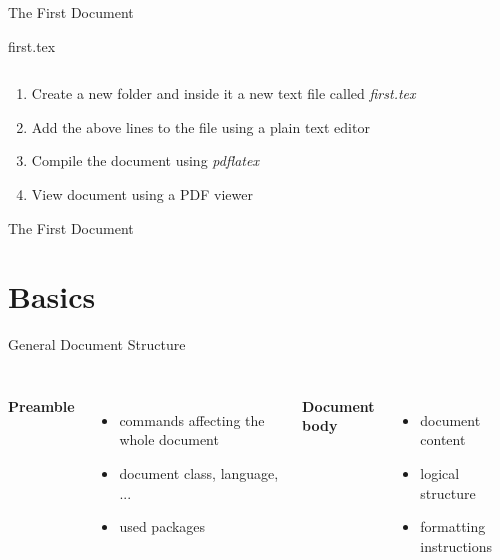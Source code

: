 \documentclass[table]{beamer}
\begin{document}
\begin{frame}[fragile]{The First Document}
    \begin{block}{first.tex}
        \inputminted{latex}{resource/first.tex}
    \end{block}

    \begin{enumerate}
        \item Create a new folder and inside it a new text file called \emph{first.tex}
        \item Add the above lines to the file using a plain text editor
        \item Compile the document using \emph{pdflatex}
        \item View document using a PDF viewer
    \end{enumerate}
\end{frame}


\begin{frame}[fragile]{The First Document}
    \begin{center}
    \end{center}
\end{frame}

\section{Basics}

\begin{frame}[fragile]{General Document Structure}
    \inputminted[bgcolor=bgg]{latex}{resource/first-ann.tex}
    \vspace{2em}
    \begin{columns}
        \textbf{Preamble}
        \begin{itemize}
            \item commands affecting the whole document
            \item document class, language, ...
            \item used packages
        \end{itemize}
        \textbf{Document body}
        \begin{itemize}
            \item document content
            \item logical structure
            \item formatting instructions
        \end{itemize}
    \end{columns}

\end{frame}
\end{document}
